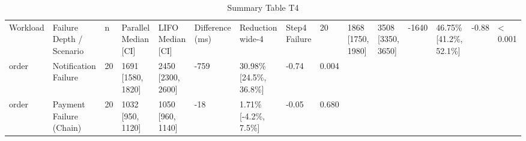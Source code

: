 \begin{table}[htbp]
\centering
\caption{Summary Table T4}
\label{tab:t4}
\begin{tabular}{lllllllll}
\toprule
Workload & Failure Depth / Scenario & n & Parallel Median [CI] & LIFO Median [CI] & Difference (ms) & Reduction %
\midrule
wide-4 & Step4 Failure & 20 & 1868 [1750, 1980] & 3508 [3350, 3650] & -1640 & 46.75\% [41.2\%, 52.1\%] & -0.88 & < 0.001 \\
order & Notification Failure & 20 & 1691 [1580, 1820] & 2450 [2300, 2600] & -759 & 30.98\% [24.5\%, 36.8\%] & -0.74 & 0.004 \\
order & Payment Failure (Chain) & 20 & 1032 [950, 1120] & 1050 [960, 1140] & -18 & 1.71\% [-4.2\%, 7.5\%] & -0.05 & 0.680 \\
\bottomrule
\end{tabular}
\end{table}
